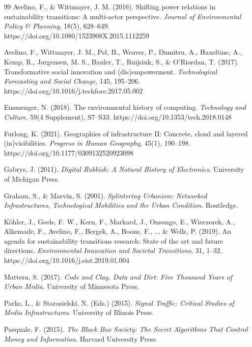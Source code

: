 \documentclass[review]{elsarticle}
\begin{document}
\begin{thebibliography}{99}
Avelino, F., \& Wittmayer, J. M. (2016). Shifting power relations in sustainability transitions: A multi-actor perspective. \textit{Journal of Environmental Policy \& Planning}, 18(5), 628--649. https://doi.org/10.1080/1523908X.2015.1112259

Avelino, F., Wittmayer, J. M., Pel, B., Weaver, P., Dumitru, A., Haxeltine, A., Kemp, R., J{\o}rgensen, M. S., Bauler, T., Ruijsink, S., \& O'Riordan, T. (2017). Transformative social innovation and (dis)empowerment. \textit{Technological Forecasting and Social Change}, 145, 195--206. https://doi.org/10.1016/j.techfore.2017.05.002

Ensmenger, N. (2018). The environmental history of computing. \textit{Technology and Culture}, 59(4 Supplement), S7--S33. https://doi.org/10.1353/tech.2018.0148

Furlong, K. (2021). Geographies of infrastructure II: Concrete, cloud and layered (in)visibilities. \textit{Progress in Human Geography}, 45(1), 190--198. https://doi.org/10.1177/0309132520923098

Gabrys, J. (2011). \textit{Digital Rubbish: A Natural History of Electronics}. University of Michigan Press.

Graham, S., \& Marvin, S. (2001). \textit{Splintering Urbanism: Networked Infrastructures, Technological Mobilities and the Urban Condition}. Routledge.

K{\"o}hler, J., Geels, F. W., Kern, F., Markard, J., Onsongo, E., Wieczorek, A., Alkemade, F., Avelino, F., Bergek, A., Boons, F., ... \& Wells, P. (2019). An agenda for sustainability transitions research: State of the art and future directions. \textit{Environmental Innovation and Societal Transitions}, 31, 1--32. https://doi.org/10.1016/j.eist.2019.01.004

Mattern, S. (2017). \textit{Code and Clay, Data and Dirt: Five Thousand Years of Urban Media}. University of Minnesota Press.

Parks, L., \& Starosielski, N. (Eds.) (2015). \textit{Signal Traffic: Critical Studies of Media Infrastructures}. University of Illinois Press.

Pasquale, F. (2015). \textit{The Black Box Society: The Secret Algorithms That Control Money and Information}. Harvard University Press.


\end{thebibliography}
\end{document}
